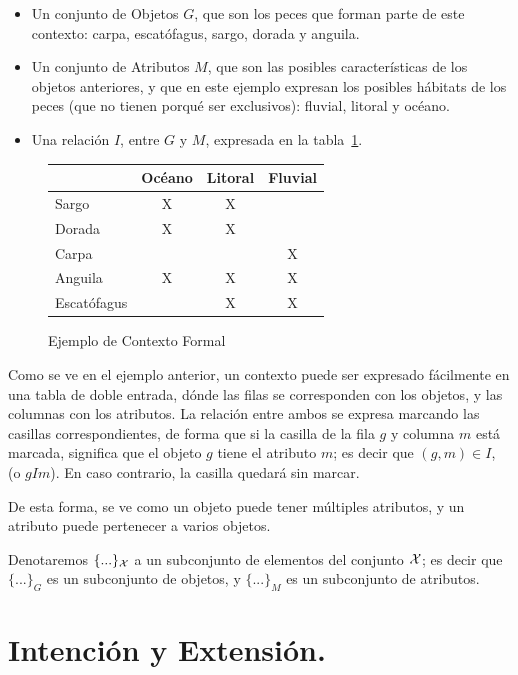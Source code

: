 \begin{itemize}
	\item Un conjunto de Objetos $G$, que son los peces que forman parte de este contexto: carpa, escatófagus, sargo, dorada y anguila.
	\item Un conjunto de Atributos $M$, que son las posibles características de los objetos anteriores, y que en este ejemplo expresan los posibles hábitats de los peces (que no tienen porqué ser exclusivos): fluvial, litoral y océano.
	\item Una relación $I$, entre $G$ y $M$, expresada en la tabla~\ref{fig:contexto}.
\end{itemize}

\begin{figure}[h]

\centering
{ 
\begin{tabular}{|l|c|c|c|}
\hline
& Océano & Litoral & Fluvial \\
\hline
Sargo &  X  &  X  &    \\ \hline
Dorada &  X  &  X  &    \\ \hline
Carpa &    &    &  X  \\ \hline
Anguila &  X  &  X  &  X  \\ \hline
Escatófagus &    &  X  &  X  \\ \hline
\end{tabular}
}
\caption{Ejemplo de Contexto Formal
\label{fig:contexto}
}

\end{figure}

Como se ve en el ejemplo anterior, un contexto puede ser expresado fácilmente en una tabla de doble entrada, dónde las filas se corresponden con los objetos, y las columnas con los atributos. La relación entre ambos se expresa marcando las casillas correspondientes, de forma que si la casilla de la fila $g$ y columna $m$ está marcada, significa que el objeto $g$ tiene el atributo $m$; es decir que $(g,m)\in{I}$, (o $gIm$). En caso contrario, la casilla quedará sin marcar.

De esta forma, se ve como un objeto puede tener múltiples atributos, y un atributo puede pertenecer a varios objetos.

Denotaremos $\{...\}_{\cal X}$ a un subconjunto de elementos del conjunto ${\cal X}$; es decir que $\{...\}_G$ es un subconjunto de objetos, y $\{...\}_M$ es un subconjunto de atributos.



\section{Intención y Extensión.}

